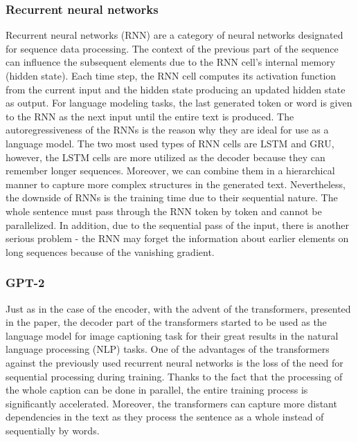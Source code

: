 \subsubsection{Recurrent neural networks}
Recurrent neural networks (RNN)\citep{rumelhart1985learning} are a category of neural networks designated for sequence data processing. The context of the previous part of the sequence can influence the subsequent elements due to the RNN cell's internal memory (hidden state). Each time step, the RNN cell computes its activation function from the current input and the hidden state producing an updated hidden state as output. For language modeling tasks, the last generated token or word is given to the RNN as the next input until the entire text is produced. The autoregressiveness of the RNNs is the reason why they are ideal for use as a language model. The two most used types of RNN cells are LSTM\citep{hochreiter1997long} and GRU\citep{cho2014learning}, however, the LSTM cells are more utilized as the decoder because they can remember longer sequences. Moreover, we can combine them in a hierarchical manner to capture more complex structures in the generated text. Nevertheless, the downside of RNNs is the training time due to their sequential nature. The whole sentence must pass through the RNN token by token and cannot be parallelized. In addition, due to the sequential pass of the input, there is another serious problem - the RNN may forget the information about earlier elements on long sequences because of the vanishing gradient.

\subsubsection{GPT-2}
Just as in the case of the encoder, with the advent of the transformers, presented in the \citet{vaswani2017attention} paper, the decoder part of the transformers started to be used as the language model for image captioning task for their great results in the natural language processing (NLP) tasks. One of the advantages of the transformers against the previously used recurrent neural networks is the loss of the need for sequential processing during training. Thanks to the fact that the processing of the whole caption can be done in parallel, the entire training process is significantly accelerated. Moreover, the transformers can capture more distant dependencies in the text as they process the sentence as a whole instead of sequentially by words.\\

